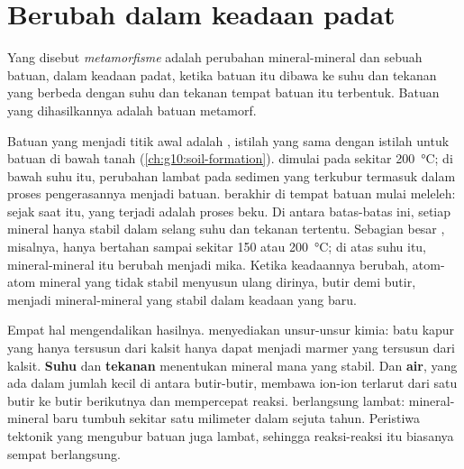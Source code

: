 \section{Berubah dalam keadaan padat}

\begin{definition}[Metamorfisme]\label{def:g12:metamorphic-rocks:metamorphism}
Yang disebut \emph{metamorfisme} adalah perubahan
mineral-mineral dan  sebuah batuan, dalam keadaan padat, ketika batuan
itu dibawa ke suhu dan tekanan yang berbeda dengan suhu dan tekanan tempat
batuan itu terbentuk. Batuan yang dihasilkannya adalah batuan metamorf.
\end{definition}

Batuan yang menjadi titik awal  adalah , istilah
yang sama dengan istilah untuk batuan di bawah tanah (\cref{ch:g10:soil-formation}).
 dimulai pada sekitar \qty{200}{\celsius}; di bawah suhu itu,
perubahan lambat pada sedimen yang terkubur termasuk dalam proses pengerasannya
menjadi batuan.  berakhir di tempat batuan mulai meleleh: sejak saat
itu, yang terjadi adalah proses beku. Di antara batas-batas ini, setiap mineral
hanya stabil dalam selang suhu dan tekanan tertentu. Sebagian besar , misalnya, hanya bertahan sampai sekitar 150 atau \qty{200}{\celsius};
di atas suhu itu, mineral-mineral itu berubah menjadi mika. Ketika keadaannya
berubah, atom-atom mineral yang tidak stabil menyusun ulang dirinya, butir demi
butir, menjadi mineral-mineral yang stabil dalam keadaan yang baru.

Empat hal mengendalikan hasilnya. \textbf{} menyediakan unsur-unsur
kimia: batu kapur yang hanya tersusun dari kalsit hanya dapat menjadi marmer
yang tersusun dari kalsit. \textbf{Suhu} dan \textbf{tekanan} menentukan mineral
mana yang stabil. Dan \textbf{air}, yang ada dalam jumlah kecil di antara
butir-butir, membawa ion-ion terlarut dari satu butir ke butir berikutnya dan
mempercepat reaksi.  berlangsung lambat: mineral-mineral baru tumbuh
sekitar satu milimeter dalam sejuta tahun. Peristiwa tektonik yang mengubur
batuan juga lambat, sehingga reaksi-reaksi itu biasanya sempat berlangsung.

